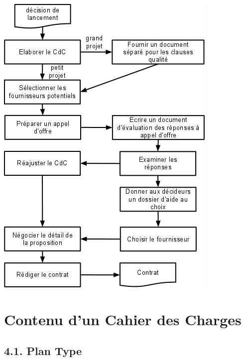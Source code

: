 \documentclass{mise_en_page}
\begin{document}
\includegraphics[width=10.663cm,height=15.081cm]{BP22020Aide20C3A020la20rC3A9daction20dun20CdC20Logiciel-img2.png}




\section[Contenu d’un Cahier des Charges]{Contenu d’un
Cahier des Charges}
\subsection[Plan Type]{4.1. Plan Type}
\end{document}
